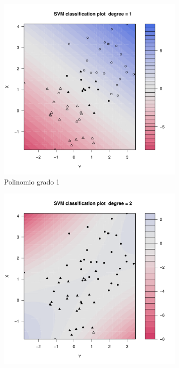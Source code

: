 \begin{figure}[H]
	\centering
	\begin{subfigure}{0.24\linewidth}
		\includegraphics[width=1\linewidth]{Graphics/Problema_01/Experiment_02_1.pdf}
		\caption{Polinomio grado 1}
	\end{subfigure}
	\begin{subfigure}{0.24\linewidth}
		\includegraphics[width=1\linewidth]{Graphics/Problema_01/Experiment_02_2.pdf}

\end{subfigure}
\end{figure}
